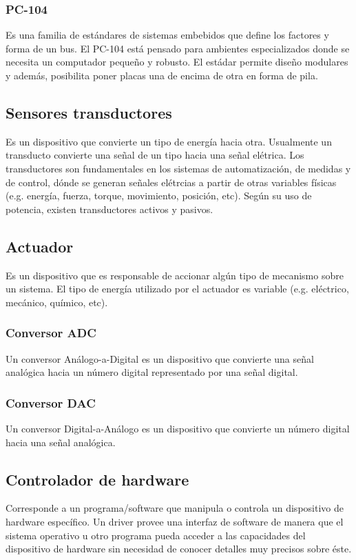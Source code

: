 \subsubsection{PC-104}
Es una familia de estándares de sistemas embebidos que define los factores y forma de un bus. El PC-104 está pensado para ambientes especializados donde se necesita un computador pequeño y robusto. El estádar permite diseño modulares y además, posibilita poner placas una de encima de otra en forma de pila.
\subsection{Sensores transductores}
Es un dispositivo que convierte un tipo de energía hacia otra. Usualmente un transducto convierte una señal de un tipo hacia una señal el\'etrica. 
Los transductores son fundamentales en los sistemas de automatización, de medidas y de control, dónde se generan señales el\'etrcias a partir de otras variables físicas (e.g. energía, fuerza, torque, movimiento, posición, etc). Según su uso de potencia, existen transductores activos y pasivos.

\subsection{Actuador}
Es un dispositivo que es responsable de accionar algún tipo de mecanismo sobre un sistema. El tipo de energía utilizado por el actuador es variable (e.g. el\'ectrico, mecánico, químico, etc).
\subsubsection{Conversor ADC}
Un conversor Análogo-a-Digital es un dispositivo que convierte una señal analógica hacia un número digital representado por una señal digital.
\subsubsection{Conversor DAC}
Un conversor Digital-a-Análogo es un dispositivo que convierte un número digital hacia una señal analógica.
\subsection{Controlador de hardware}
Corresponde a un programa/software que manipula o controla un dispositivo de hardware específico. Un driver provee una interfaz de software de manera que el sistema operativo u otro programa pueda acceder a las capacidades del dispositivo de hardware sin necesidad de conocer detalles muy precisos sobre \'este.
